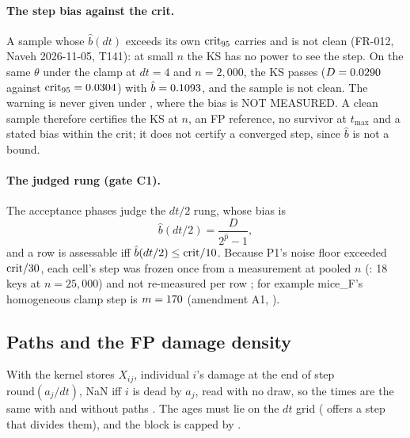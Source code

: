 \paragraph{The step bias against the crit.} A sample whose $\hat b(dt)$ exceeds its own ${\rm crit}_{95}$ carries
 and is not clean  (FR-012, Naveh 2026-11-05, T141):
at small $n$ the KS has no power to see the step. On the same $\theta$ under the clamp at $dt=4$ and $n=2{,}000$, the
KS passes ($D=\verify{specs/004-samplers/review/evidence/sr_naveh_004/clean_vs_bias.json}{rows[2].ks_D}{.4f}{0.0290}$ against
${\rm crit}_{95}=\verify{specs/004-samplers/review/evidence/sr_naveh_004/clean_vs_bias.json}{rows[2].crit_95}{.4f}{0.0304}$) with
$\hat b=\verify{specs/004-samplers/review/evidence/sr_naveh_004/clean_vs_bias.json}{rows[2].bias_at_dt}{.4f}{0.1093}$, and the sample is not clean.
The warning is never given under , where the bias is NOT MEASURED. A clean sample therefore certifies
the KS at $n$, an FP reference, no survivor at $t_{\max}$ and a stated bias within the crit; it does not certify a
converged step, since $\hat b$ is not a bound.

\paragraph{The judged rung (gate C1).} The acceptance phases judge the $dt/2$ rung, whose bias is
\begin{equation}\label{eq:lgv-judged}
  \hat b(dt/2)=\frac{D}{2^{\hat p}-1},
\end{equation}
and a row is assessable iff $\hat b(dt/2)\le{\rm crit}/10$. Because P1's noise floor exceeded ${\rm crit}/30$, each
cell's step was frozen once from a measurement at pooled $n$ (: 18 keys at $n=25{,}000$) and not
re-measured per row ; for example mice\_F's homogeneous clamp step is
$m=\verify{tests/acceptance/results/p1_pooled_004.json}{frozen.mice_F|hom|clamp.m}{d}{170}$
(amendment A1, ).

\subsection{Paths and the FP damage density}\label{sec:lgv-paths}

With  the kernel stores $X_{ij}$, individual $i$'s damage at the end of step
$\mathrm{round}(a_j/dt)$, NaN iff $i$ is dead by $a_j$, read with no draw, so the times are the same with and without
paths . The ages must lie on the $dt$ grid
( offers a step that divides them), and the block is capped by .

